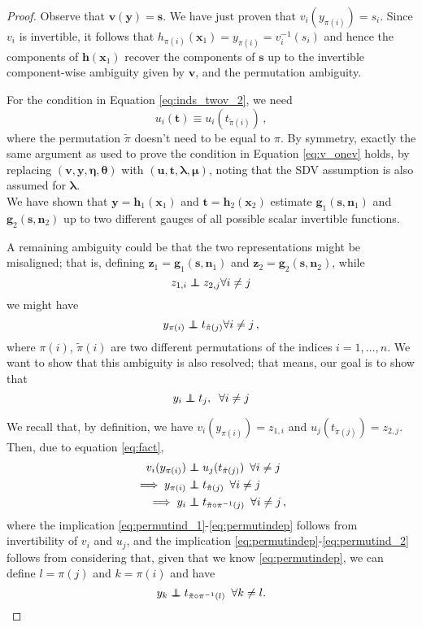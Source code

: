 \begin{proof}
	Observe that $\bm{v}(\bm{y}) = \bm{s}$.
	We have just proven that $v_i(y_{\pi(i)}) = s_i$.
	Since $v_i$ is invertible, it follows that $h_{\pi(i)}(\bm{x}_{1}) = y_{\pi(i)} = v_i^{-1}(s_i)$ and hence the components of $\bm{h}(\bm{x}_{1})$ recover the components of $\bm{s}$ up to the invertible component-wise ambiguity given by $\bm{v}$, and the permutation ambiguity.
	
	For the condition in Equation \ref{eq:inds_twov_2}, we need
	\begin{equation}
	\label{eq:u_onev}
	u_{i}(\bm{t})  \equiv u_{i}(t_{\tilde{\pi}(i)})\,,
	\end{equation}
	where the permutation $\tilde{\pi}$ doesn't need to be equal to $\pi$.
	By symmetry, exactly the same argument as used to prove the condition in Equation \ref{eq:v_onev} holds, by replacing $(\bm{v},\bm{y}, \bm{\eta}, \bm{\theta})$ with $(\bm{u},\bm{t}, \bm{\lambda}, \bm{\mu})$, noting that the SDV assumption is also assumed for $\bm{\lambda}$.
	\\
	We have shown that $\bm{y}=\bm{h}_1(\bm{x}_1)$ and $\bm{t}=\bm{h}_2(\bm{x}_2)$ estimate $\bm{g}_1(\bm{s}, \bm{n}_1)$ and $\bm{g}_2(\bm{s}, \bm{n}_2)$ up to two different gauges of all possible scalar invertible functions.
	
	A remaining ambiguity could be that the two representations might be misaligned; that is, defining $\bm{z}_1=\bm{g}_1(\bm{s}, \bm{n}_1)$ and $\bm{z}_2=\bm{g}_2(\bm{s}, \bm{n}_2)$, while
	\begin{equation}
	z_{1,i} \independent z_{2,j} \forall i \neq j \label{eq:fact}
	\end{equation}
	we might have
	\[
	y_{\pi(i)} \independent t_{\tilde{\pi}(j)} \forall i \neq j\,,
	\]
	where $\pi(i)$, $\tilde{\pi}(i)$ are two different permutations of the indices $i=1, \ldots, n$. We want to show that this ambiguity is also resolved; that means, our goal is to show that
	\begin{equation}
	y_{i} \independent t_{j},\;\;\forall i \neq j \label{eq:aim_lastpart}
	\end{equation}
	
	
	We recall that, by definition, we have $v_i(y_{\pi(i)}) = z_{1,i}$ and $u_j(t_{\tilde{\pi}(j)}) = z_{2,j}$. Then, due to equation \ref{eq:fact},
	\begin{align}
	v_i(y_{\pi(i)}) & \independent u_j(t_{\tilde{\pi}(j)}) \,\,\, \forall i \neq j \label{eq:permutind_1}\\
	\implies y_{\pi(i)} & \independent t_{\tilde{\pi}(j)} \,\,\, \forall i \neq j \label{eq:permutindep}\\
	\implies y_{i} & \independent t_{\tilde{\pi}\circ \pi^{-1} (j)} \,\,\, \forall i \neq j\,, \label{eq:permutind_2}
	\end{align}
	where the implication \ref{eq:permutind_1}-\ref{eq:permutindep} follows from invertibility of $v_i$ and $u_j$, and the implication \ref{eq:permutindep}-\ref{eq:permutind_2} follows from considering that, given that we know \ref{eq:permutindep}, we can define $l=\pi(j)$ and $k=\pi(i)$ and have
	\[
	y_{k}  \independent t_{\tilde{\pi} \circ \pi^{-1} (l)} \,\,\, \forall k \neq l.
	\]
	

\end{proof}
